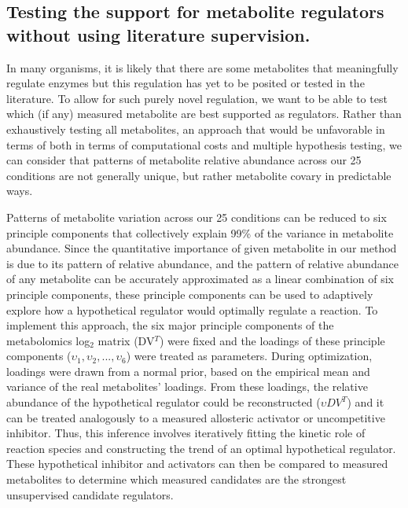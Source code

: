 \subsection{Testing the support for metabolite regulators without using literature supervision.}

In many organisms, it is likely that there are some metabolites that meaningfully regulate enzymes but this regulation has yet to be posited or tested in the literature.  To allow for such purely novel regulation, we want to be able to test which (if any) measured metabolite are best supported as regulators.  Rather than exhaustively testing all metabolites, an approach that would be unfavorable in terms of both in terms of computational costs and multiple hypothesis testing, we can consider that patterns of metabolite relative abundance across our 25 conditions are not generally unique, but rather metabolite covary in predictable ways.  

Patterns of metabolite variation across our 25 conditions can be reduced to six principle components that collectively explain 99\% of the variance in metabolite abundance.  Since the quantitative importance of given metabolite in our method is due to its pattern of relative abundance, and the pattern of relative abundance of any metabolite can be accurately approximated as a linear combination of six principle components, these principle components can be used to adaptively explore how a hypothetical regulator would optimally regulate a reaction.  To implement this approach, the six major principle components of the metabolomics log$_{2}$ matrix (DV$^{T}$) were fixed and the loadings of these principle components ($\upsilon_{1}, \upsilon_{2}, ..., \upsilon_{6}$) were treated as parameters.  During optimization, loadings were drawn from a normal prior, based on the empirical mean and variance of the real metabolites' loadings.  From these loadings, the relative abundance of the hypothetical regulator could be reconstructed ($\upsilon DV^{T}$) and it can be treated analogously to a measured allosteric activator or uncompetitive inhibitor.  Thus, this inference involves iteratively fitting the kinetic role of reaction species and constructing the trend of an optimal hypothetical regulator.  These hypothetical inhibitor and activators can then be compared to measured metabolites to determine which measured candidates are the strongest unsupervised candidate regulators.

